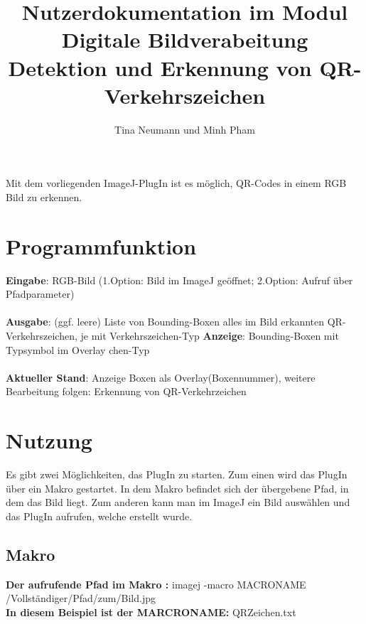 \documentclass[a4paper,11pt,parskip]{article}
\begin{document}
\title{Nutzerdokumentation im Modul Digitale Bildverabeitung\\  
\textbf{Detektion und Erkennung von QR-Verkehrszeichen}}
\author{Tina Neumann und Minh Pham}

\maketitle

Mit dem vorliegenden ImageJ-PlugIn ist es möglich, QR-Codes in einem RGB Bild zu erkennen.

\section{Programmfunktion}

\textbf{Eingabe}: RGB-Bild (1.Option: Bild im ImageJ geöffnet; 2.Option: Aufruf über Pfadparameter)\\ \\
\textbf{Ausgabe}: (ggf. leere) Liste von Bounding-Boxen alles im Bild erkannten QR-Verkehrszeichen, je mit Verkehrszeichen-Typ
\textbf{Anzeige}: Bounding-Boxen mit Typsymbol im Overlay
chen-Typ\\ \\
\textbf{Aktueller Stand}: Anzeige Boxen als Overlay(Boxennummer), weitere Bearbeitung folgen: Erkennung von QR-Verkehrzeichen

\section{Nutzung}
Es gibt zwei Möglichkeiten, das PlugIn zu starten. Zum einen wird das PlugIn über ein Makro gestartet. In dem Makro befindet sich der übergebene Pfad, in dem das Bild liegt. Zum anderen kann man im ImageJ ein Bild auswählen und das PlugIn aufrufen, welche erstellt wurde.

\subsection{Makro}
\textbf{Der aufrufende Pfad im Makro :} imagej -macro MACRONAME /Vollständiger/Pfad/zum/Bild.jpg \\

\textbf{In diesem Beispiel ist der MARCRONAME:} QRZeichen.txt
\end{document}
